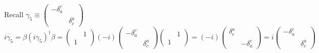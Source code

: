 \documentclass[twoside]{amsart}
\begin{document}
Recall $\gamma_5 \equiv \left( \begin{matrix} - \delta_a^c & \\ & \delta^{\dot{a}}_{\dot{c}} \end{matrix} \right)$ \\ 
  \[
\overline{i\gamma_5} = \beta (i \gamma_5)^{\dag} \beta = \left( \begin{matrix} & 1 \\ 1  & \end{matrix} \right) (-i) \left( \begin{matrix} -\delta_{\dot{a}}^{\dot{c}} & \\ & \delta^a_{\dot{c}} \end{matrix} \right) \left( \begin{matrix} & 1 \\ 1 & \end{matrix} \right)= (-i)\left( \begin{matrix} \delta^a_c & \\ & - \delta_{\dot{a}}^{\dot{c}} \end{matrix} \right) = i \left( \begin{matrix} - \delta_a^c & \\ & \delta^{\dot{a}}_{\dot{c}} \end{matrix} \right)
\]
\end{document}
